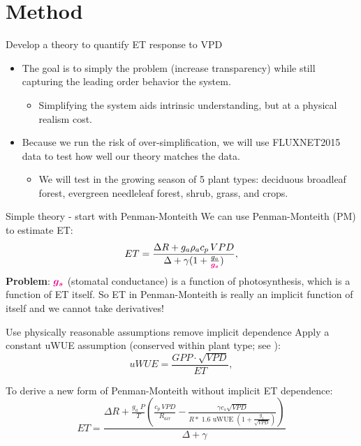 \documentclass[aspectratio=169]{beamer}
\begin{document}
\section{Method}
\begin{frame}{Develop a theory to quantify ET response to VPD}
  \begin{itemize}
  \item The goal is to simply the problem (increase transparency) while still capturing the leading order behavior the system.
    \begin{itemize}
    \item Simplifying the system aids intrinsic understanding, but at a physical realism cost.
    \end{itemize}
  \item Because we run the risk of over-simplification, we will use FLUXNET2015 data to test how well our theory matches the data.
    \begin{itemize}
    \item We will test in the growing season of 5 plant types: deciduous broadleaf forest, evergreen needleleaf forest, shrub, grass, and crops.
    \end{itemize}
  \end{itemize}
\end{frame}

\begin{frame}{Simple theory - start with Penman-Monteith}
  We can use Penman-Monteith (PM) to estimate ET:
  \[ET = \frac{\Delta R + g_a \rho_a c_p \, VPD}{\Delta + \gamma(1 + \frac{g_a}{\textcolor{magenta}{\boldsymbol{g_s}}})},\]
    \textbf{Problem}: \Large $\textcolor{magenta}{\boldsymbol{g_s}}$ \normalsize (stomatal conductance) is a function of photosynthesis, which is a function of ET itself.  So ET in Penman-Monteith is really an implicit function of itself and we cannot take derivatives!
\end{frame}

\begin{frame}{Use physically reasonable assumptions remove implicit dependence}
  Apply a constant uWUE assumption (conserved within plant type; see \cite{Zhou_2016}):
  \[uWUE = \frac{GPP \cdot \sqrt{VPD}}{ET},\]
  \begin{overprint}
    To derive a new form of Penman-Monteith without implicit ET dependence:
    \[  ET = \frac{\Delta R + \frac{g_a\; P}{T} \left( \frac{ c_p \, VPD}{R_{air}} -  \frac{\gamma c_s \sqrt{VPD} }{ R* \; 1.6 \text{ uWUE } (1 + \frac{g_1}{\sqrt{VPD}})} \right)}{ \Delta + \gamma}\]
    \end{overprint}
\end{frame}
\end{document}

